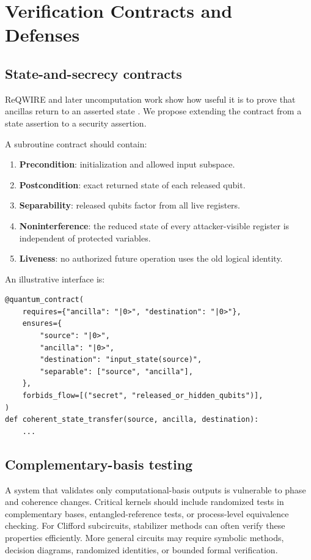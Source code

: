 \section{Verification Contracts and Defenses}
\label{sec:defenses}
\label{sec:verification-contracts}

\subsection{State-and-secrecy contracts}

ReQWIRE and later uncomputation work show how useful it is to prove that
ancillas return to an asserted state \cite{rand2019reqwire,venev2024uncomputation}.
We propose extending the contract from a state assertion to a security
assertion.

A subroutine contract should contain:

\begin{enumerate}
  \item \textbf{Precondition}: initialization and allowed input subspace.
  \item \textbf{Postcondition}: exact returned state of each released qubit.
  \item \textbf{Separability}: released qubits factor from all live registers.
  \item \textbf{Noninterference}: the reduced state of every attacker-visible
  register is independent of protected variables.
  \item \textbf{Liveness}: no authorized future operation uses the old logical
  identity.
\end{enumerate}

An illustrative interface is:

\begin{lstlisting}[style=python]
@quantum_contract(
    requires={"ancilla": "|0>", "destination": "|0>"},
    ensures={
        "source": "|0>",
        "ancilla": "|0>",
        "destination": "input_state(source)",
        "separable": ["source", "ancilla"],
    },
    forbids_flow=[("secret", "released_or_hidden_qubits")],
)
def coherent_state_transfer(source, ancilla, destination):
    ...
\end{lstlisting}

\subsection{Complementary-basis testing}

A system that validates only computational-basis outputs is vulnerable to phase
and coherence changes. Critical kernels should include randomized tests in
complementary bases, entangled-reference tests, or process-level equivalence
checking. For Clifford subcircuits, stabilizer methods can often verify these
properties efficiently. More general circuits may require symbolic methods,
decision diagrams, randomized identities, or bounded formal verification.

